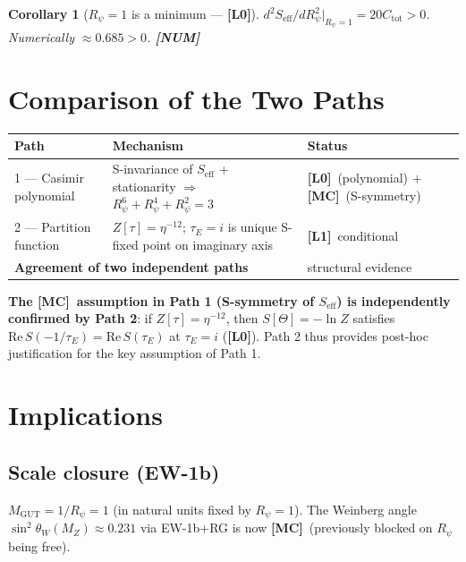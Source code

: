 \documentclass[12pt,a4paper]{article}
\newtheorem{corollary}[theorem]{Corollary}
\theoremstyle{definition}\newtheorem{definition}[theorem]{Definition}
\theoremstyle{remark}\newtheorem{remark}[theorem]{Remark}
\newcommand{\Lz}{\textbf{[L0]}}
\newcommand{\Lo}{\textbf{[L1]}}
\newcommand{\MC}{\textbf{[MC]}}
\newcommand{\NUM}{\textbf{[NUM]}}
\begin{document}
\begin{corollary}[$R_\psi=1$ is a minimum — \Lz]
\label{cor:min}
$d^2S_{\mathrm{eff}}/dR_\psi^2|_{R_\psi=1} = 20C_{\mathrm{tot}} > 0$.
Numerically $\approx 0.685 > 0$. \NUM
\end{corollary}

\section{Comparison of the Two Paths}
\label{sec:compare}

\begin{resultbox}
\begin{center}
\renewcommand{\arraystretch}{1.35}
\begin{tabular}{p{3.6cm}p{5.5cm}p{3.5cm}}
  \toprule
  \textbf{Path} & \textbf{Mechanism} & \textbf{Status} \\
  \midrule
  1 — Casimir polynomial &
    S-invariance of $S_{\mathrm{eff}}$ + stationarity
    $\Rightarrow$ $R_\psi^6+R_\psi^4+R_\psi^2=3$ &
    \Lz\ (polynomial) $+$ \MC\ (S-symmetry) \\[4pt]
  2 — Partition function &
    $Z[\tau]=\eta^{-12}$; $\tau_E=i$ is unique S-fixed point
    on imaginary axis &
    \Lo\ conditional \\
  \midrule
  \multicolumn{2}{l}{\textbf{Agreement of two independent paths}} &
    structural evidence \\
  \bottomrule
\end{tabular}
\end{center}

\medskip
\textbf{The \MC\ assumption in Path 1 (S-symmetry of $S_{\mathrm{eff}}$)
is independently confirmed by Path 2}: if $Z[\tau]=\eta^{-12}$, then
$S[\Theta]=-\ln Z$ satisfies
$\mathrm{Re}\,S(-1/\tau_E)=\mathrm{Re}\,S(\tau_E)$ at $\tau_E=i$
(\Lz).  Path 2 thus provides post-hoc justification for the key
assumption of Path 1.
\end{resultbox}

\section{Implications}
\label{sec:implications}

\subsection*{Scale closure (EW-1b)}
$M_{\mathrm{GUT}} = 1/R_\psi = 1$ (in natural units fixed by
$R_\psi=1$).  The Weinberg angle $\sin^2\theta_W(M_Z)\approx 0.231$
via EW-1b+RG is now \MC\ (previously blocked on $R_\psi$ being free).
\end{document}
